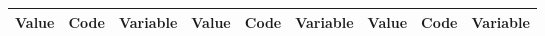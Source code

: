 \begin{table}
\centering
\begin{tabular}{|ccc||ccc||ccc|}
\hline
Value & Code & Variable & Value & Code & Variable & Value & Code & Variable \\
\hline

\hline
\end{tabular}
\end{table}

